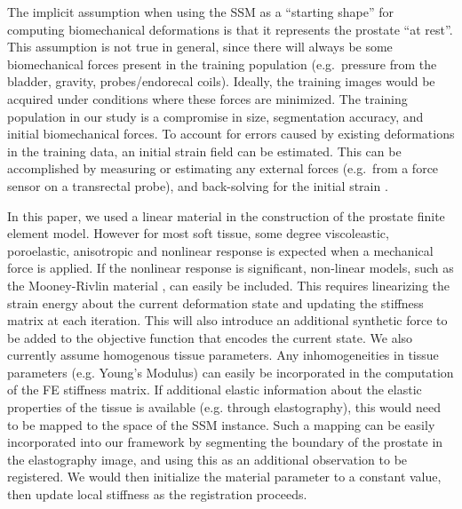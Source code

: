 \documentclass[journal]{IEEEtran}
\newcommand{\comment}[1]{\textcolor{red}{#1}}
\begin{document}
The implicit assumption when using the SSM as a ``starting shape'' for computing biomechanical deformations is that it represents the prostate ``at rest''.  This assumption is not true in general, since there will always be some biomechanical forces present in the training population (e.g.~pressure from the bladder, gravity, probes/endorecal coils).  Ideally, the training images would be acquired under conditions where these forces are minimized.  The training population in our study is a compromise in size, segmentation accuracy, and initial biomechanical forces.  To account for errors caused by existing deformations in the training data, an initial strain field can be estimated.  This can be accomplished by measuring or estimating any external forces (e.g.~from a force sensor on a transrectal probe), and back-solving for the initial strain \cite{pelteret2012a}.

In this paper, we used a linear material in the construction of the prostate finite element model. However for most soft tissue, some degree viscoleastic, poroelastic, anisotropic and nonlinear response is expected when a mechanical force is applied. If the nonlinear response is significant, non-linear models, such as the Mooney-Rivlin material \cite{Rivlin48}, can easily be included.  This requires linearizing the strain energy about the current deformation state and updating the stiffness matrix at each iteration. This will also introduce an additional synthetic force to be added to the objective function that encodes the current state.  We also currently assume homogenous tissue parameters.  Any inhomogeneities in tissue parameters (e.g. Young's Modulus) can easily be incorporated in the computation of the FE stiffness matrix.  If additional elastic information about the elastic properties of the tissue is available (e.g. through elastography), this would need to be mapped to the space of the SSM instance.  Such a mapping can be easily incorporated into our framework by segmenting the boundary of the prostate in the elastography image, and using this as an additional observation to be registered.  We would then initialize the material parameter to a constant value, then update local stiffness as the registration proceeds.
\end{document}
